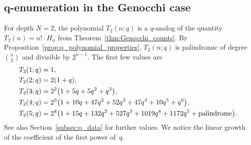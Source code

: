 \documentclass[10pt,a4paper]{amsart}
\numberwithin{equation}{section}
\theoremstyle{definition}
\begin{document}
\subsection[q-enumeration in the Genocchi case]{$\boldsymbol{q}$-enumeration in the Genocchi case}
\label{subsec:q_genocchi_case}

For depth $N=2$, the polynomial $T_2(n;q)$ is a $q$-analog of the quantity
$T_2(n) = n! \cdot H_n$ from Theorem~\ref{thm:Genocchi_counts}.
By Proposition~\ref{prop:q_polynomial_properties}, $T_2(n;q)$ is palindromic of degree
$\binom{n}{2}$ and divisible by $2^{n-1}$.
The first few values are
\begin{align*}
	&T_2(1;q)= 1, \\
	&T_2(2;q)= 2(1+q), \\
	&T_2(3;q)= 2^2\bigl(1+5q+5q^2+q^3\bigr), \\
	&T_2(4;q)= 2^3\bigl(1+10q+47q^2+52q^3+47q^4+10q^5+q^6\bigr), \\
	 &T_2(5;q)=
	2^4\bigl(1+15q+132q^2+527q^3+1019q^4+1172q^5+\textnormal{palindrome}\bigr).
\end{align*}
See also Section~\ref{subsec:q_data} for further values.
We notice the linear growth of the coefficient of the first power of~$q$.
\end{document}
